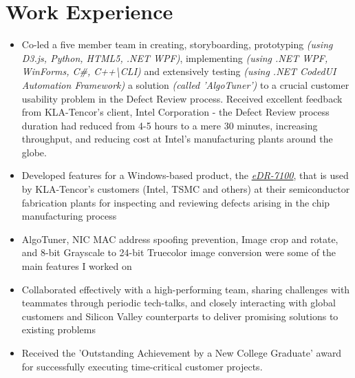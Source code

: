 \section{Work Experience}

	
\vspace{1.8mm}
	\begin{itemize}
		\setlength\itemsep{0.3em}
		\item Co-led a five member team in creating, storyboarding, prototyping \emph{(using D3.js, Python, HTML5, .NET WPF)}, implementing \emph{(using .NET WPF, WinForms, C\#, C++\textbackslash CLI)} and extensively testing \emph{(using .NET CodedUI Automation Framework)} a solution \emph{(called 'AlgoTuner')} to a crucial customer usability problem in the Defect Review process. Received excellent feedback from KLA-Tencor's client, Intel Corporation - the Defect Review process duration had reduced from 4-5 hours to a mere 30 minutes, increasing throughput, and reducing cost at Intel's manufacturing plants around the globe.
		\item Developed features for a Windows-based product, the \href{http://www.kla-tencor.com/Defect-Review/edr-7100-series.html}{\emph{eDR-7100}}, that is used by KLA-Tencor's customers (Intel, TSMC and others) at their semiconductor fabrication plants for inspecting and reviewing defects arising in the chip manufacturing process 
		\item AlgoTuner, NIC MAC address spoofing prevention, Image crop and rotate, and 8-bit Grayscale to 24-bit Truecolor image conversion were some of the main features I worked on
		\item Collaborated effectively with a high-performing team, sharing challenges with teammates through periodic tech-talks, and closely interacting with global customers and Silicon Valley counterparts to deliver promising solutions to existing problems
		\item Received the 'Outstanding Achievement by a New College Graduate' award for successfully executing time-critical customer projects.
	\end{itemize}
	
